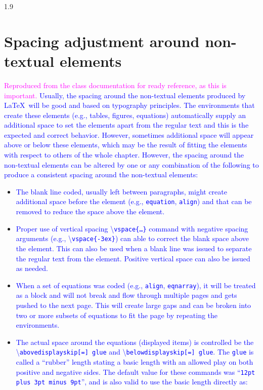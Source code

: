 \documentclass[phd]{ndsu-thesis-2022}
\newcommand\myspacing{1.9}      %
\newcommand\italk[1]{\textcolor{blue}{#1}}  %
\newcommand\cmd[1]{\textbackslash\texttt{#1}}  %
\begin{document}
\begin{spacing}{\myspacing}
\section{Spacing adjustment around non-textual elements}
\textcolor{magenta}{Reproduced from the class documentation	for ready reference, as this is important.} \italk{Usually, the spacing around the non-textual elements produced by \LaTeX\ will be good and based on typography principles. The environments that create these elements (e.g., tables, figures, equations) automatically supply an additional space to set the elements apart from the regular text and this is the expected and correct behavior. However, sometimes additional space will appear above or below these elements, which may be the result of fitting the elements with respect to others of the whole chapter. However, the spacing around the non-textual elements can be altered by one or any combination of the following to produce a consistent spacing around the non-textual elements:}
\begin{itemize}
\item
\italk{The blank line coded, usually left between paragraphs, might create additional space before the element (e.g., \texttt{equation}, \texttt{align}) and that can be removed to reduce the space above the element.}
\item
\italk{Proper use of vertical spacing \cmd{vspace\{\ldots\}} command with negative spacing arguments (e.g., \cmd{vspace\{-3ex\}}) can able to correct the blank space above the element. This can also be used when a blank line was issued to separate the regular text from the element. Positive vertical space can also be issued as needed.}
\item
\italk{When a set of equations was coded (e.g., \texttt{align}, \texttt{eqnarray}), it will be treated as a block and will not break and flow through multiple pages and gets pushed to the next page. This will create large gaps and can be broken into two or more subsets of equations to fit the page by repeating the environments.}
\item
\italk{The actual space around the equations (displayed items) is controlled be the \\ \cmd{abovedisplayskip[=] glue} and \cmd{belowdisplayskip[=] glue}.
The \texttt{glue} is called a ``rubber'' length stating a basic length with an allowed play on both positive and negative sides. The default value for these commands was ``\texttt{12pt plus 3pt minus 9pt}'', and is also valid to use the basic length directly as:} 


\end{itemize}
\end{spacing}
\end{document}
